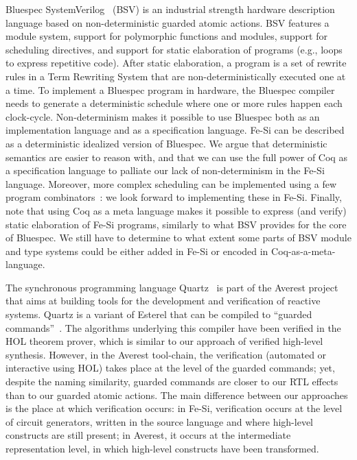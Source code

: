 \documentclass{llncs}
\begin{document}
\medskip

Bluespec SystemVerilog~\cite{bsv-by-example} (BSV) is an industrial
strength hardware description language based on non-deterministic
guarded atomic actions. BSV features a module system, support for
polymorphic functions and modules, support for scheduling directives,
and support for static elaboration of programs (e.g., loops to express
repetitive code).
%
After static elaboration, a program is a set of rewrite rules in a
Term Rewriting System that are non-deterministically executed one at a
time.
%
To implement a Bluespec program in hardware, the Bluespec compiler
needs to generate a deterministic schedule where one or more rules
happen each clock-cycle.
%
Non-determinism makes it possible to use Bluespec both as an
implementation language and as a specification language.
%
Fe-Si can be described as a deterministic idealized version of
Bluespec.
%
We argue that deterministic semantics are easier to reason with, and
that we can use the full power of Coq as a specification language to
palliate our lack of non-determinism in the Fe-Si language.
%
Moreover, more complex scheduling can be implemented using a few
program combinators~\cite{DBLP:conf/memocode/DaveAP07}: we look
forward to implementing these in Fe-Si.
%
Finally, note that using Coq as a meta language makes it possible to
express (and verify) static elaboration of Fe-Si programs, similarly
to what BSV provides for the core of Bluespec. 
%
We still have to determine to what extent some parts of BSV module and
type systems could be either added in Fe-Si or encoded in
Coq-as-a-meta-language.

\medskip

The synchronous programming language Quartz~\cite{quartz} is part of
the Averest project that aims at building tools for the development
and verification of reactive systems.
%
Quartz is a variant of Esterel that can be compiled to
``guarded commands''~\cite{DBLP:conf/acsd/Schneider01}. The algorithms
underlying this compiler have been verified in the HOL theorem prover,
which is similar to our approach of verified high-level synthesis.
%
However, in the Averest tool-chain, the verification (automated or
interactive using HOL) takes place at the level of the guarded
commands; yet, despite the naming similarity, guarded commands are
closer to our RTL effects than to our guarded atomic actions.
%
The main difference between our approaches is the place at which
verification occurs: in Fe-Si, verification occurs at the level of
circuit generators, written in the source language and where
high-level constructs are still present; in Averest, it
occurs at the intermediate representation level, in which
high-level constructs have been transformed.
\end{document}
